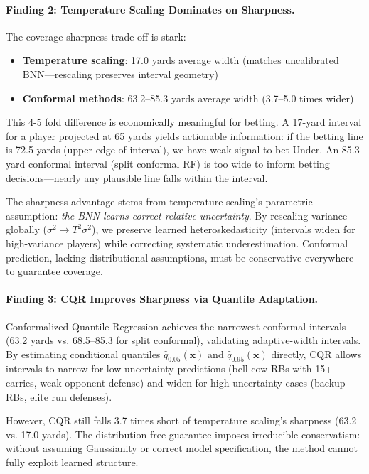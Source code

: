 \paragraph{Finding 2: Temperature Scaling Dominates on Sharpness.}
The coverage-sharpness trade-off is stark:

\begin{itemize}
    \item \textbf{Temperature scaling}: 17.0 yards average width (matches uncalibrated BNN—rescaling preserves interval geometry)
    \item \textbf{Conformal methods}: 63.2--85.3 yards average width (3.7--5.0 times wider)
\end{itemize}

This 4-5 fold difference is economically meaningful for betting. A 17-yard interval for a player projected at 65 yards yields actionable information: if the betting line is 72.5 yards (upper edge of interval), we have weak signal to bet Under. An 85.3-yard conformal interval (split conformal RF) is too wide to inform betting decisions—nearly any plausible line falls within the interval.

The sharpness advantage stems from temperature scaling's parametric assumption: \textit{the BNN learns correct relative uncertainty}. By rescaling variance globally ($\sigma^2 \to T^2 \sigma^2$), we preserve learned heteroskedasticity (intervals widen for high-variance players) while correcting systematic underestimation. Conformal prediction, lacking distributional assumptions, must be conservative everywhere to guarantee coverage.

\paragraph{Finding 3: CQR Improves Sharpness via Quantile Adaptation.}
Conformalized Quantile Regression achieves the narrowest conformal intervals (63.2 yards vs. 68.5--85.3 for split conformal), validating adaptive-width intervals. By estimating conditional quantiles $\hat{q}_{0.05}(\mathbf{x})$ and $\hat{q}_{0.95}(\mathbf{x})$ directly, CQR allows intervals to narrow for low-uncertainty predictions (bell-cow RBs with 15+ carries, weak opponent defense) and widen for high-uncertainty cases (backup RBs, elite run defenses).

However, CQR still falls 3.7 times short of temperature scaling's sharpness (63.2 vs. 17.0 yards). The distribution-free guarantee imposes irreducible conservatism: without assuming Gaussianity or correct model specification, the method cannot fully exploit learned structure.

